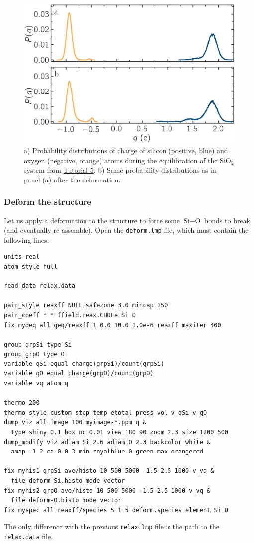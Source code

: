 \documentclass[9pt,tutorial]{livecoms}
\newcommand{\flecmd}[1]{\textcolor{command}{\texttt{#1}}} %
\begin{document}
\begin{figure}
\includegraphics[width=\linewidth]{SIO-distribution}
\caption{a) Probability distributions of charge of silicon (positive, blue) and oxygen
(negative, orange) atoms during the equilibration of the $\text{SiO}_2$ system
from \hyperref[reactive-silicon-dioxide-label]{Tutorial 5}.  b) Same probability distributions
as in panel (a) after the deformation.}
\label{fig:SIO-distribution}
\end{figure}

\subsubsection{Deform the structure}

Let us apply a deformation to the structure to force some $\text{Si}-\text{O}$
bonds to break (and eventually re-assemble).  Open the \flecmd{deform.lmp}
file, which must contain the following lines:
\begin{lstlisting}
units real
atom_style full

read_data relax.data

pair_style reaxff NULL safezone 3.0 mincap 150
pair_coeff * * ffield.reax.CHOFe Si O
fix myqeq all qeq/reaxff 1 0.0 10.0 1.0e-6 reaxff maxiter 400

group grpSi type Si
group grpO type O
variable qSi equal charge(grpSi)/count(grpSi)
variable qO equal charge(grpO)/count(grpO)
variable vq atom q

thermo 200
thermo_style custom step temp etotal press vol v_qSi v_qO
dump viz all image 100 myimage-*.ppm q &
  type shiny 0.1 box no 0.01 view 180 90 zoom 2.3 size 1200 500
dump_modify viz adiam Si 2.6 adiam O 2.3 backcolor white &
  amap -1 2 ca 0.0 3 min royalblue 0 green max orangered

fix myhis1 grpSi ave/histo 10 500 5000 -1.5 2.5 1000 v_vq &
  file deform-Si.histo mode vector
fix myhis2 grpO ave/histo 10 500 5000 -1.5 2.5 1000 v_vq &
  file deform-O.histo mode vector
fix myspec all reaxff/species 5 1 5 deform.species element Si O
\end{lstlisting}
The only difference with the previous \flecmd{relax.lmp} file is the path to
the \flecmd{relax.data} file.
\end{document}
